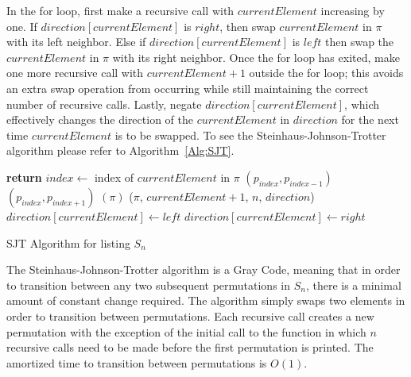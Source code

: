 In the for loop, first make a recursive call with $currentElement$ increasing by one. 
If $direction[currentElement]$ is $right$, then swap $currentElement$ in $\pi$ with its left neighbor. Else 
if $direction[currentElement]$ is $left$ then swap the $currentElement$ in $\pi$ with its right neighbor.
Once the for loop has exited, make one more recursive call with $currentElement+1$ outside the for loop; 
this avoids an extra swap operation from occurring while still maintaining the correct number of recursive 
calls. Lastly, negate $direction[currentElement]$, which effectively changes the direction of the $currentElement$ 
in $direction$ for the next time $currentElement$ is to be swapped. 
To see the Steinhaus-Johnson-Trotter algorithm please refer to Algorithm~\ref{Alg:SJT}.

\begin{algorithm}
    \begin{algorithmic}[1]
                \EndIf
                \State \textbf{return}
            \EndIf
                \State $index \gets $ index of $currentElement$ in $\pi$
                    $(p_{index}, p_{index-1})$
                \Else 
                    $(p_{index}, p_{index+1})$
                \EndIf
                $(\pi)$
            \EndFor
            ($\pi$, $currentElement+1$, $n$, $direction$)
                \State $direction[currentElement] \gets left$
            \Else 
                \State $direction[currentElement] \gets right$
            \EndIf
        \EndFunction
        
    \end{algorithmic}
    \caption{SJT Algorithm for listing $S_{n}$}
    \label{Alg:SJT}
\end{algorithm}

The Steinhaus-Johnson-Trotter algorithm is a Gray Code, meaning that in order to transition 
between any two subsequent permutations in $S_{n}$, there is a minimal amount of constant 
change required. The algorithm simply swaps two elements in order to transition between 
permutations. Each recursive call creates a new permutation with the exception of the 
initial call to the function in which $n$ recursive calls need to be made before the 
first permutation is printed. The amortized time to transition between permutations is $O(1)$.





